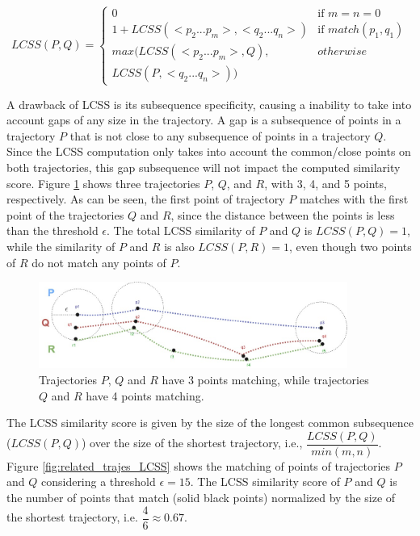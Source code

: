 \begin{equation}
\label{func:LCSS}
  LCSS(P, Q) = 
  \begin{cases} 
      0 & \text{if } m = n = 0\\ 
      1 + LCSS(<p_2...p_m>,<q_2...q_n>) & \text{if } match(p_1, q_1)\\
      max(LCSS(<p_2...p_m>, Q),  & otherwise \\
      LCSS(P, <q_2...q_n>))
  \end{cases}
\end{equation}

A drawback of LCSS is its subsequence specificity, causing a inability to take into account gaps of any size in the trajectory. A  gap is a subsequence of points in a trajectory $P$ that is not close to any subsequence of points in a trajectory $Q$. Since the LCSS computation only takes into account the common/close points on both trajectories, this gap subsequence will not impact the computed similarity score. Figure \ref{fig:related_trajes_PQR} shows three trajectories $P$, $Q$, and $R$, with 3, 4, and 5 points, respectively. {As can be seen, the first point of trajectory $P$ matches with the first point of the trajectories $Q$ and $R$, since the distance between the points is less than the threshold $\epsilon$}. The total LCSS similarity of $P$ and $Q$ is $LCSS(P, Q) = 1$, while the similarity of $P$ and $R$ is also $LCSS(P, R) = 1$, even though two points of $R$ do not match any points of $P$.


\begin{figure}[h]
\centering
\includegraphics[width=0.9\textwidth]{Related_Works/related_trajes_PQR.jpg}
\caption{\label{fig:related_trajes_PQR}Trajectories $P$, $Q$ and $R$ have 3 points matching, while trajectories $Q$ and $R$ have 4 points matching.}
\end{figure}

The LCSS similarity score is given by the size of the longest common subsequence ($LCSS(P, Q)$) over the size of the shortest trajectory, i.e., $\dfrac{LCSS(P, Q)}{min(m, n)}$.
Figure \ref{fig:related_trajes_LCSS} shows the matching of points of trajectories $P$ and $Q$ considering a threshold $\epsilon =15$. The LCSS similarity score of $P$ and $Q$ is the number of points that match (solid black points) normalized by the size of the shortest trajectory, i.e. $\dfrac{4}{6} \approx 0.67 $.


